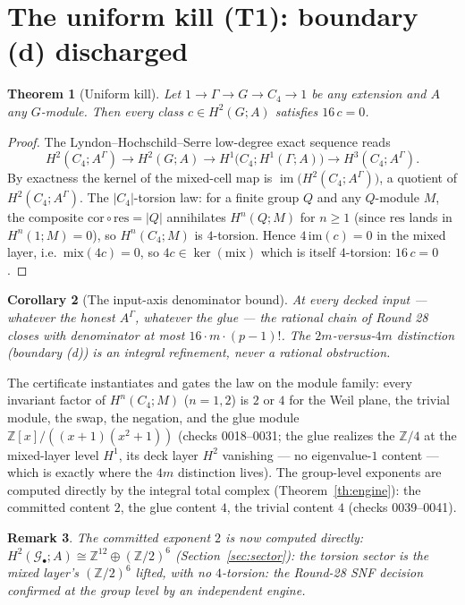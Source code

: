 \documentclass[11pt]{article}
\newtheorem{theorem}{Theorem}
\newtheorem{corollary}[theorem]{Corollary}
\newtheorem{remark}[theorem]{Remark}
\newcommand{\GammaL}{\Gamma}
\newcommand{\Cfour}{C_4}
\newcommand{\Gbul}{\mathcal{G}_\bullet}
\newcommand{\im}{\operatorname{im}}
\newcommand{\Z}{\mathbb{Z}}
\begin{document}
\section{The uniform kill (T1): boundary (d) discharged}

\begin{theorem}[Uniform kill]\label{th:uniform}
Let $1\to\GammaL\to G\to\Cfour\to 1$ be any extension and $A$ any
$G$-module. Then every class $c\in H^2(G;A)$ satisfies $16\,c=0$.
\end{theorem}

\begin{proof}
The Lyndon--Hochschild--Serre low-degree exact sequence reads
\[
H^2(\Cfour;A^\GammaL)\longrightarrow H^2(G;A)\longrightarrow
H^1\bigl(\Cfour;H^1(\GammaL;A)\bigr)\longrightarrow H^3(\Cfour;A^\GammaL).
\]
By exactness the kernel of the mixed-cell map is
$\im\bigl(H^2(\Cfour;A^\GammaL)\bigr)$, a quotient of
$H^2(\Cfour;A^\GammaL)$. The $|\Cfour|$-torsion law: for a finite group
$Q$ and any $Q$-module $M$, the composite
$\mathrm{cor}\circ\mathrm{res}=|Q|$ annihilates $H^n(Q;M)$ for $n\ge1$
(since $\mathrm{res}$ lands in $H^n(1;M)=0$), so $H^n(\Cfour;M)$ is
$4$-torsion. Hence $4\,\mathrm{im}(c)=0$ in the mixed layer, i.e.\
$\mathrm{mix}(4c)=0$, so $4c\in\ker(\mathrm{mix})$ which is itself
$4$-torsion: $16\,c=0$.
\end{proof}

\begin{corollary}[The input-axis denominator bound]
At every decked input --- whatever the honest $A^\GammaL$, whatever the
glue --- the rational chain of Round 28 closes with denominator at most
$16\cdot m\cdot(p-1)!$. The $2m$-versus-$4m$ distinction (boundary (d))
is an integral refinement, never a rational obstruction.
\end{corollary}

The certificate instantiates and gates the law on the module family:
every invariant factor of $H^n(\Cfour;M)$ ($n=1,2$) is $2$ or $4$ for
the Weil plane, the trivial module, the swap, the negation, and the
glue module $\Z[x]/((x+1)(x^2+1))$ (checks 0018--0031; the glue
realizes the $\Z/4$ at the mixed-layer level $H^1$, its deck layer
$H^2$ vanishing --- no eigenvalue-$1$ content --- which is exactly where
the $4m$ distinction lives). The group-level exponents are computed
directly by the integral total complex (Theorem~\ref{th:engine}): the
committed content $2$, the glue content $4$, the trivial content $4$
(checks 0039--0041).

\begin{remark}
The committed exponent $2$ is now computed \emph{directly}:
$H^2(\Gbul;A)\cong\Z^{12}\oplus(\Z/2)^6$ (Section~\ref{sec:sector}):
the torsion sector is the mixed layer's $(\Z/2)^6$ lifted, with no
$4$-torsion: the Round-28 SNF decision confirmed at the group level by
an independent engine.
\end{remark}
\end{document}
